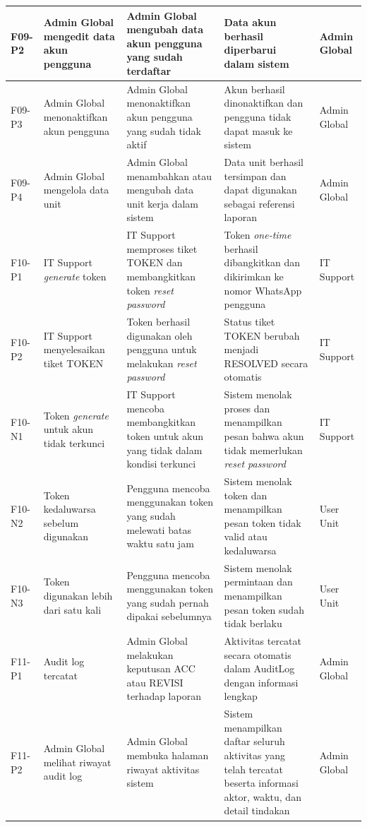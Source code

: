 \begin{longtable}{|p{}|p{}|p{}|p{}|p{}|}
    \hline
    F09-P2 & Admin Global mengedit data akun pengguna & Admin Global mengubah data akun pengguna yang sudah terdaftar & Data akun berhasil diperbarui dalam sistem & Admin Global \\
    \hline
    F09-P3 & Admin Global menonaktifkan akun pengguna & Admin Global menonaktifkan akun pengguna yang sudah tidak aktif & Akun berhasil dinonaktifkan dan pengguna tidak dapat masuk ke sistem & Admin Global \\
    \hline
    F09-P4 & Admin Global mengelola data unit & Admin Global menambahkan atau mengubah data unit kerja dalam sistem & Data unit berhasil tersimpan dan dapat digunakan sebagai referensi laporan & Admin Global \\
    \hline
    F10-P1 & IT Support \textit{generate} token & IT Support memproses tiket TOKEN dan membangkitkan token \textit{reset password} & Token \textit{one-time} berhasil dibangkitkan dan dikirimkan ke nomor WhatsApp pengguna & IT Support \\
    \hline
    F10-P2 & IT Support menyelesaikan tiket TOKEN & Token berhasil digunakan oleh pengguna untuk melakukan \textit{reset password} & Status tiket TOKEN berubah menjadi RESOLVED secara otomatis & IT Support \\
    \hline
    F10-N1 & Token \textit{generate} untuk akun tidak terkunci & IT Support mencoba membangkitkan token untuk akun yang tidak dalam kondisi terkunci & Sistem menolak proses dan menampilkan pesan bahwa akun tidak memerlukan \textit{reset password} & IT Support \\
    \hline
    F10-N2 & Token kedaluwarsa sebelum digunakan & Pengguna mencoba menggunakan token yang sudah melewati batas waktu satu jam & Sistem menolak token dan menampilkan pesan token tidak valid atau kedaluwarsa & User Unit \\
    \hline
    F10-N3 & Token digunakan lebih dari satu kali & Pengguna mencoba menggunakan token yang sudah pernah dipakai sebelumnya & Sistem menolak permintaan dan menampilkan pesan token sudah tidak berlaku & User Unit \\
    \hline
    F11-P1 & Audit log tercatat & Admin Global melakukan keputusan ACC atau REVISI terhadap laporan & Aktivitas tercatat secara otomatis dalam AuditLog dengan informasi lengkap & Admin Global \\
    \hline
    F11-P2 & Admin Global melihat riwayat audit log & Admin Global membuka halaman riwayat aktivitas sistem & Sistem menampilkan daftar seluruh aktivitas yang telah tercatat beserta informasi aktor, waktu, dan detail tindakan & Admin Global \\

\end{longtable}

